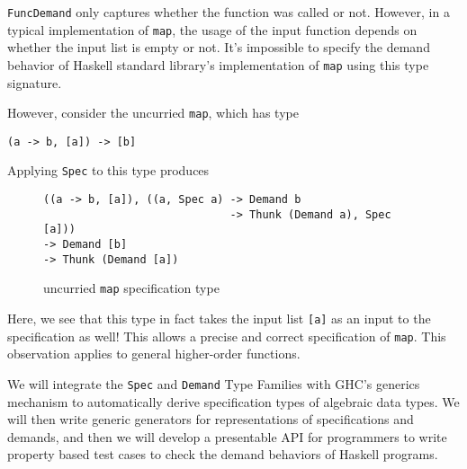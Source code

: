 \documentclass{article}
\begin{document}
\verb|FuncDemand| only captures whether the function was called or not. However,
in a typical implementation of \verb|map|, the usage of the input function
depends on whether the input list is empty or not. It's impossible to specify
the demand behavior of Haskell standard library's implementation of \verb|map|
using this type signature.

However, consider the uncurried \verb|map|, which has type
\begin{verbatim}
(a -> b, [a]) -> [b]
\end{verbatim}

\clearpage
Applying \verb|Spec| to this type produces
\begin{figure}[H]
  \centering
\begin{verbatim}
((a -> b, [a]), ((a, Spec a) -> Demand b
                             -> Thunk (Demand a), Spec [a]))
-> Demand [b]
-> Thunk (Demand [a])
\end{verbatim}
\caption{uncurried \texttt{map} specification type}
\end{figure}

Here, we see that this type in fact takes the input list \verb|[a]| as an input
to the specification as well! This allows a precise and correct specification of
\verb|map|. This observation applies to general higher-order functions.

We will integrate the \verb|Spec| and \verb|Demand| Type Families with GHC's
generics mechanism to automatically derive specification types of algebraic data
types. We will then write generic generators for representations of
specifications and demands, and then we will develop a presentable API for
programmers to write property based test cases to check the demand behaviors of
Haskell programs.
\end{document}
